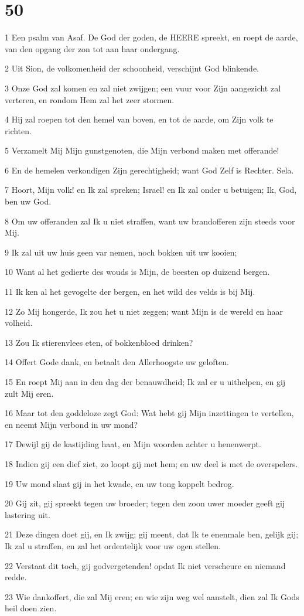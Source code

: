 \chapter{50}

\par 1 Een psalm van Asaf. De God der goden, de HEERE spreekt, en roept de aarde, van den opgang der zon tot aan haar ondergang.
\par 2 Uit Sion, de volkomenheid der schoonheid, verschijnt God blinkende.
\par 3 Onze God zal komen en zal niet zwijgen; een vuur voor Zijn aangezicht zal verteren, en rondom Hem zal het zeer stormen.
\par 4 Hij zal roepen tot den hemel van boven, en tot de aarde, om Zijn volk te richten.
\par 5 Verzamelt Mij Mijn gunstgenoten, die Mijn verbond maken met offerande!
\par 6 En de hemelen verkondigen Zijn gerechtigheid; want God Zelf is Rechter. Sela.
\par 7 Hoort, Mijn volk! en Ik zal spreken; Israel! en Ik zal onder u betuigen; Ik, God, ben uw God.
\par 8 Om uw offeranden zal Ik u niet straffen, want uw brandofferen zijn steeds voor Mij.
\par 9 Ik zal uit uw huis geen var nemen, noch bokken uit uw kooien;
\par 10 Want al het gedierte des wouds is Mijn, de beesten op duizend bergen.
\par 11 Ik ken al het gevogelte der bergen, en het wild des velds is bij Mij.
\par 12 Zo Mij hongerde, Ik zou het u niet zeggen; want Mijn is de wereld en haar volheid.
\par 13 Zou Ik stierenvlees eten, of bokkenbloed drinken?
\par 14 Offert Gode dank, en betaalt den Allerhoogste uw geloften.
\par 15 En roept Mij aan in den dag der benauwdheid; Ik zal er u uithelpen, en gij zult Mij eren.
\par 16 Maar tot den goddeloze zegt God: Wat hebt gij Mijn inzettingen te vertellen, en neemt Mijn verbond in uw mond?
\par 17 Dewijl gij de kastijding haat, en Mijn woorden achter u henenwerpt.
\par 18 Indien gij een dief ziet, zo loopt gij met hem; en uw deel is met de overspelers.
\par 19 Uw mond slaat gij in het kwade, en uw tong koppelt bedrog.
\par 20 Gij zit, gij spreekt tegen uw broeder; tegen den zoon uwer moeder geeft gij lastering uit.
\par 21 Deze dingen doet gij, en Ik zwijg; gij meent, dat Ik te enenmale ben, gelijk gij; Ik zal u straffen, en zal het ordentelijk voor uw ogen stellen.
\par 22 Verstaat dit toch, gij godvergetenden! opdat Ik niet verscheure en niemand redde.
\par 23 Wie dankoffert, die zal Mij eren; en wie zijn weg wel aanstelt, dien zal Ik Gods heil doen zien.

